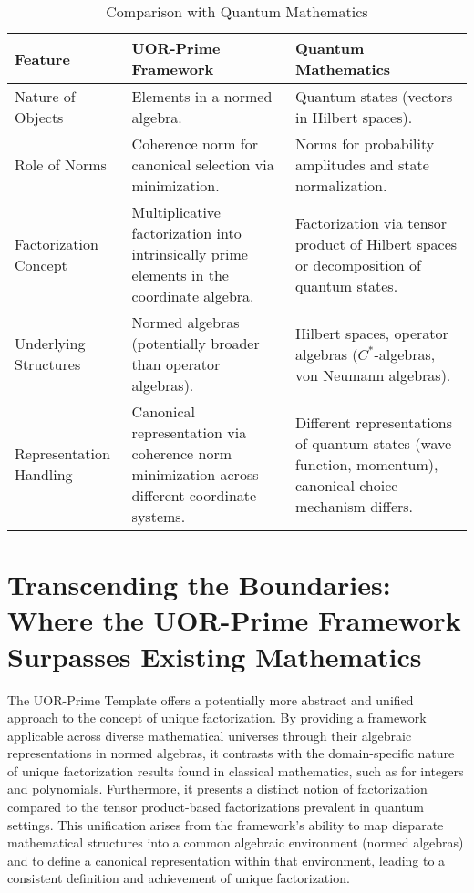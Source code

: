 \documentclass{article}
\begin{document}
\begin{table}[h!]
    \centering
    \begin{tabular}{|l|l|l|}
        \hline
        Feature & UOR-Prime Framework & Quantum Mathematics \\
        \hline
        Nature of Objects & Elements in a normed algebra. & Quantum states (vectors in Hilbert spaces). \\
        \hline
        Role of Norms & Coherence norm for canonical selection via minimization. & Norms for probability amplitudes and state normalization. \\
        \hline
        Factorization Concept & Multiplicative factorization into intrinsically prime elements in the coordinate algebra. & Factorization via tensor product of Hilbert spaces or decomposition of quantum states. \\
        \hline
        Underlying Structures & Normed algebras (potentially broader than operator algebras). & Hilbert spaces, operator algebras ($C^*$-algebras, von Neumann algebras). \\
        \hline
        Representation Handling & Canonical representation via coherence norm minimization across different coordinate systems. & Different representations of quantum states (wave function, momentum), canonical choice mechanism differs. \\
        \hline
    \end{tabular}
    \caption{Comparison with Quantum Mathematics}
    \label{tab:comparison_quantum}
\end{table}

\section{Transcending the Boundaries: Where the UOR-Prime Framework Surpasses Existing Mathematics}

The UOR-Prime Template offers a potentially more abstract and unified approach to the concept of unique factorization. By providing a framework applicable across diverse mathematical universes through their algebraic representations in normed algebras, it contrasts with the domain-specific nature of unique factorization results found in classical mathematics, such as for integers and polynomials. Furthermore, it presents a distinct notion of factorization compared to the tensor product-based factorizations prevalent in quantum settings. This unification arises from the framework's ability to map disparate mathematical structures into a common algebraic environment (normed algebras) and to define a canonical representation within that environment, leading to a consistent definition and achievement of unique factorization.
\end{document}
